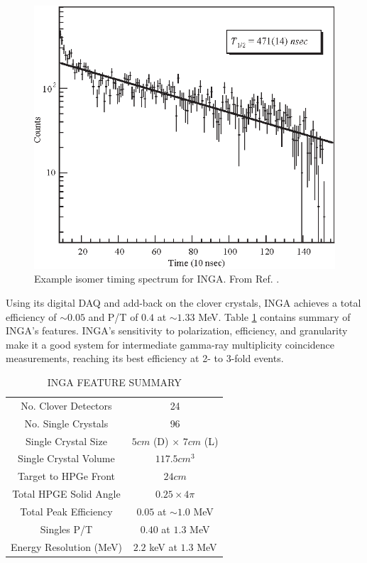 \begin{figure}[h!]
	\centerline{\includegraphics[height=0.35\textheight]{./img/c3/INGA_isomer.eps}}
	\caption{Example isomer timing spectrum for INGA. From Ref. \cite{IngaDigitalDAQ}.\label{fig:chp3-INGA-isomer}}
\end{figure}

Using its digital DAQ and add-back on the clover crystals, INGA achieves a total efficiency of $\sim0.05$ and P/T of $0.4$ at $\sim1.33$ MeV. Table \ref{tbl:inga-summary} contains summary of INGA's features. INGA's sensitivity to polarization, efficiency, and granularity make it a good system for intermediate gamma-ray multiplicity coincidence measurements, reaching its best efficiency at 2- to 3-fold events.

\begin{table}[ht!]
\caption{INGA FEATURE SUMMARY\label{tbl:inga-summary}}
\begin{center}
\begin{tabular}{|c|c|}
\hline
\hline
No. Clover Detectors      & 24\\ 
No. Single Crystals       & 96\\ 
Single Crystal Size       & $5 cm$ (D) $\times$ $7 cm$ (L) \\
Single Crystal Volume     & $117.5 cm^3$\\
Target to HPGe Front      & $24 cm$\\ 
Total HPGE Solid Angle    & $0.25 \times 4\pi$\\ 
Total Peak Efficiency     & $0.05$ at $\sim1.0$ MeV\\ 
Singles P/T               & $0.40$ at $1.3$ MeV \\ 
Energy Resolution (MeV)   & $2.2$ keV at $1.3$ MeV \\ 
\hline 
\hline 
\end{tabular}
\end{center}
\end{table}

